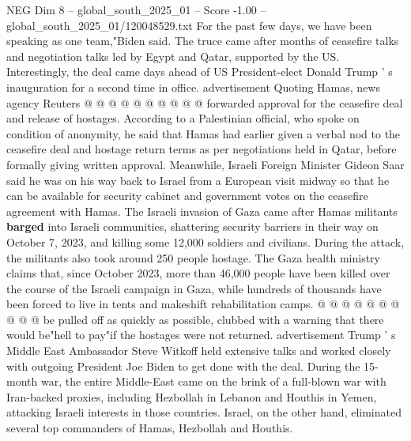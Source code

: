 \begin{textsample}{NEG Dim 8 – global\_south\_2025\_01 – Score -1.00 – global\_south\_2025\_01/120048529.txt}
For the past few days, we have been speaking as one team,"Biden said.
The truce came after months of ceasefire talks and negotiation talks led by Egypt and Qatar, supported by the US.
Interestingly, the deal came days ahead of US President-elect Donald Trump ' s inauguration for a second time in office. advertisement Quoting Hamas, news agency Reuters @ @ @ @ @ @ @ @ @ @ forwarded approval for the ceasefire deal and release of hostages.
According to a Palestinian official, who spoke on condition of anonymity, he said that Hamas had earlier given a verbal nod to the ceasefire deal and hostage return terms as per negotiations held in Qatar, before formally giving written approval.
Meanwhile, Israeli Foreign Minister Gideon Saar said he was on his way back to Israel from a European visit midway so that he can be available for security cabinet and government votes on the ceasefire agreement with Hamas.
The Israeli invasion of Gaza came after Hamas militants \textbf{barged} into Israeli communities, shattering security barriers in their way on October 7, 2023, and killing some 12,000 soldiers and civilians.
During the attack, the militants also took around 250 people hostage.
The Gaza health ministry claims that, since October 2023, more than 46,000 people have been killed over the course of the Israeli campaign in Gaza, while hundreds of thousands have been forced to live in tents and makeshift rehabilitation camps. @ @ @ @ @ @ @ @ @ @ be pulled off as quickly as possible, clubbed with a warning that there would be"hell to pay"if the hostages were not returned. advertisement Trump ' s Middle East Ambassador Steve Witkoff held extensive talks and worked closely with outgoing President Joe Biden to get done with the deal.
During the 15-month war, the entire Middle-East came on the brink of a full-blown war with Iran-backed proxies, including Hezbollah in Lebanon and Houthis in Yemen, attacking Israeli interests in those countries.
Israel, on the other hand, eliminated several top commanders of Hamas, Hezbollah and Houthis.

\end{textsample}
